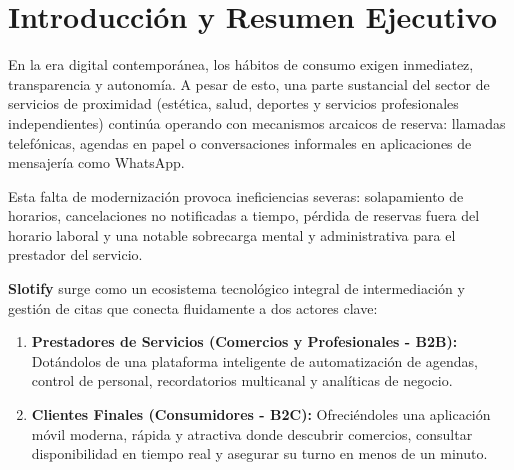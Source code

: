 \documentclass[11pt,a4paper]{article}
\begin{document}
\nopagecolor
{}
\newpage

\tableofcontents
\newpage
{}

\section{Introducción y Resumen Ejecutivo}

En la era digital contemporánea, los hábitos de consumo exigen inmediatez, transparencia y autonomía. A pesar de esto, una parte sustancial del sector de servicios de proximidad (estética, salud, deportes y servicios profesionales independientes) continúa operando con mecanismos arcaicos de reserva: llamadas telefónicas, agendas en papel o conversaciones informales en aplicaciones de mensajería como WhatsApp.

Esta falta de modernización provoca ineficiencias severas: solapamiento de horarios, cancelaciones no notificadas a tiempo, pérdida de reservas fuera del horario laboral y una notable sobrecarga mental y administrativa para el prestador del servicio.

\textbf{Slotify} surge como un ecosistema tecnológico integral de intermediación y gestión de citas que conecta fluidamente a dos actores clave:
\begin{enumerate}
    \item \textbf{Prestadores de Servicios (Comercios y Profesionales - B2B):} Dotándolos de una plataforma inteligente de automatización de agendas, control de personal, recordatorios multicanal y analíticas de negocio.
    \item \textbf{Clientes Finales (Consumidores - B2C):} Ofreciéndoles una aplicación móvil moderna, rápida y atractiva donde descubrir comercios, consultar disponibilidad en tiempo real y asegurar su turno en menos de un minuto.
\end{enumerate}

\begin{center}
\end{center}
\end{document}
